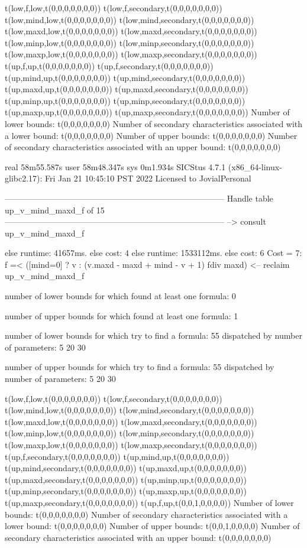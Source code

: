 t(low,f,low,t(0,0,0,0,0,0,0))
t(low,f,secondary,t(0,0,0,0,0,0,0))
t(low,mind,low,t(0,0,0,0,0,0,0))
t(low,mind,secondary,t(0,0,0,0,0,0,0))
t(low,maxd,low,t(0,0,0,0,0,0,0))
t(low,maxd,secondary,t(0,0,0,0,0,0,0))
t(low,minp,low,t(0,0,0,0,0,0,0))
t(low,minp,secondary,t(0,0,0,0,0,0,0))
t(low,maxp,low,t(0,0,0,0,0,0,0))
t(low,maxp,secondary,t(0,0,0,0,0,0,0))
t(up,f,up,t(0,0,0,0,0,0,0))
t(up,f,secondary,t(0,0,0,0,0,0,0))
t(up,mind,up,t(0,0,0,0,0,0,0))
t(up,mind,secondary,t(0,0,0,0,0,0,0))
t(up,maxd,up,t(0,0,0,0,0,0,0))
t(up,maxd,secondary,t(0,0,0,0,0,0,0))
t(up,minp,up,t(0,0,0,0,0,0,0))
t(up,minp,secondary,t(0,0,0,0,0,0,0))
t(up,maxp,up,t(0,0,0,0,0,0,0))
t(up,maxp,secondary,t(0,0,0,0,0,0,0))
Number of lower bounds:                                             t(0,0,0,0,0,0,0)
Number of secondary characteristics associated with a lower bound:  t(0,0,0,0,0,0,0)
Number of upper bounds:                                             t(0,0,0,0,0,0,0)
Number of secondary characteristics associated with an upper bound: t(0,0,0,0,0,0,0)

real	58m55.587s
user	58m48.347s
sys	0m1.934s
SICStus 4.7.1 (x86_64-linux-glibc2.17): Fri Jan 21 10:45:10 PST 2022
Licensed to JovialPersonal


--------------------------------------------------------------------------------
Handle table up_v_mind_maxd_f of 15
--------------------------------------------------------------------------------
--> consult up_v_mind_maxd_f

else runtime: 41657ms. else cost: 4
else runtime: 1533112ms. else cost: 6
Cost =  7:  f =< ([mind=0] ? v : (v.maxd - maxd + mind - v + 1) fdiv maxd) %
<-- reclaim up_v_mind_maxd_f

number of lower bounds for which found at least one formula: 0

number of upper bounds for which found at least one formula: 1

number of lower bounds for which try to find a formula: 55
dispatched by number of parameters: 5  20  30

number of upper bounds for which try to find a formula: 55
dispatched by number of parameters: 5  20  30

t(low,f,low,t(0,0,0,0,0,0,0))
t(low,f,secondary,t(0,0,0,0,0,0,0))
t(low,mind,low,t(0,0,0,0,0,0,0))
t(low,mind,secondary,t(0,0,0,0,0,0,0))
t(low,maxd,low,t(0,0,0,0,0,0,0))
t(low,maxd,secondary,t(0,0,0,0,0,0,0))
t(low,minp,low,t(0,0,0,0,0,0,0))
t(low,minp,secondary,t(0,0,0,0,0,0,0))
t(low,maxp,low,t(0,0,0,0,0,0,0))
t(low,maxp,secondary,t(0,0,0,0,0,0,0))
t(up,f,secondary,t(0,0,0,0,0,0,0))
t(up,mind,up,t(0,0,0,0,0,0,0))
t(up,mind,secondary,t(0,0,0,0,0,0,0))
t(up,maxd,up,t(0,0,0,0,0,0,0))
t(up,maxd,secondary,t(0,0,0,0,0,0,0))
t(up,minp,up,t(0,0,0,0,0,0,0))
t(up,minp,secondary,t(0,0,0,0,0,0,0))
t(up,maxp,up,t(0,0,0,0,0,0,0))
t(up,maxp,secondary,t(0,0,0,0,0,0,0))
t(up,f,up,t(0,0,1,0,0,0,0))
Number of lower bounds:                                             t(0,0,0,0,0,0,0)
Number of secondary characteristics associated with a lower bound:  t(0,0,0,0,0,0,0)
Number of upper bounds:                                             t(0,0,1,0,0,0,0)
Number of secondary characteristics associated with an upper bound: t(0,0,0,0,0,0,0)

